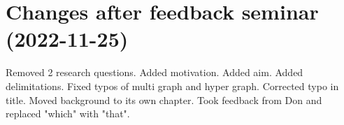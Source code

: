 \documentclass[msc,lith,english]{liuthesis}
\begin{document}
\printbibliography

\appendix
\chapter{Changes after feedback seminar (2022-11-25)}
Removed 2 research questions. Added motivation. Added aim. Added delimitations. Fixed typos of multi graph and hyper graph. Corrected typo in title. Moved background to its own chapter. Took feedback from Don and replaced "which" with "that".
\end{document}
